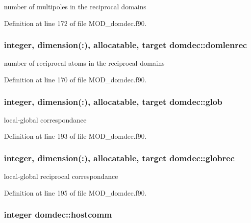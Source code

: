 number of multipoles in the reciprocal domains 



Definition at line 172 of file M\-O\-D\-\_\-domdec.\-f90.

\hypertarget{classdomdec_aa797f77d936208ae42bc625d8a581f9f}{
\subsubsection[{domlenrec}]{\setlength{\rightskip}{0pt plus 5cm}integer, dimension(\-:), allocatable, target domdec\-::domlenrec}}\label{classdomdec_aa797f77d936208ae42bc625d8a581f9f}


number of reciprocal atoms in the reciprocal domains 



Definition at line 170 of file M\-O\-D\-\_\-domdec.\-f90.

\hypertarget{classdomdec_a911e9f8522f16f4a96ca6b9ced522ea2}{
\subsubsection[{glob}]{\setlength{\rightskip}{0pt plus 5cm}integer, dimension(\-:), allocatable, target domdec\-::glob}}\label{classdomdec_a911e9f8522f16f4a96ca6b9ced522ea2}


local-\/global correspondance 



Definition at line 193 of file M\-O\-D\-\_\-domdec.\-f90.

\hypertarget{classdomdec_a38e7d056926314b002bd5a212584ff11}{
\subsubsection[{globrec}]{\setlength{\rightskip}{0pt plus 5cm}integer, dimension(\-:), allocatable, target domdec\-::globrec}}\label{classdomdec_a38e7d056926314b002bd5a212584ff11}


local-\/global reciprocal correspondance 



Definition at line 195 of file M\-O\-D\-\_\-domdec.\-f90.

\hypertarget{classdomdec_a006e80bdb6f5a7397a372768683257b2}{
\subsubsection[{hostcomm}]{\setlength{\rightskip}{0pt plus 5cm}integer domdec\-::hostcomm}}\label{classdomdec_a006e80bdb6f5a7397a372768683257b2}


